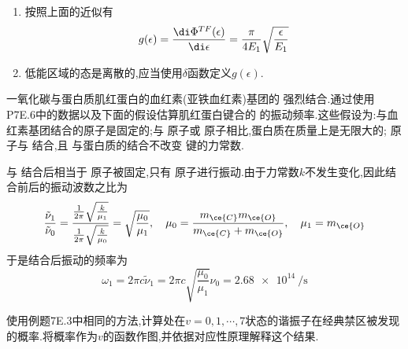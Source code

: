 \documentclass{ctexart}
\begin{document}
\begin{solution}
\begin{enumerate}[label=(\alph*)]
    即
    \[\sqrt{n_x^2+n_y^2+n_z^2}\leq\sqrt{\dfrac{\epsilon}{E_1}}\]
    也即空间中到原点的距离不大于$\sqrt{\dfrac{\epsilon}{E_1}}$的第一卦限内的点的数目.在$\ep\to\infty$时,把整点看作以其为中心的体积为$1$的正方体,所有满足条件的整点近似地组成一个半径为$\sqrt{\dfrac{\epsilon}{E_1}}$的$1/8$球,因此数目近似为
    \[\Psi(\epsilon)\approx\dfrac{1}{8}\dfrac{4}{3}\pi\left(\sqrt{\dfrac{\epsilon}{E_1}}\right)^3=\dfrac{\pi}{6}\left(\dfrac{\epsilon}{E_1}\right)^3\]
    \item 按照上面的近似有
    \[g(\epsilon)=\dfrac{\di\Phi^{TF}(\epsilon)}{\di\epsilon}=\dfrac{\pi}{4E_1}\sqrt{\dfrac{\epsilon}{E_1}}\]
    \item 低能区域的态是离散的,应当使用$\delta$函数定义$g(\epsilon)$.
\end{enumerate}
\end{solution}
\begin{homework}[15.]
    一氧化碳与蛋白质肌红蛋白的血红素(亚铁血红素)基团的 强烈结合.通过使用P7E.6中的数据以及下面的假设估算肌红蛋白键合的 的振动频率.这些假设为:与血红素基团结合的原子是固定的;与 原子或 原子相比,蛋白质在质量上是无限大的; 原子与 结合,且 与蛋白质的结合不改变 键的力常数.
\end{homework}
\begin{solution}
    与 结合后相当于 原子被固定,只有 原子进行振动.由于力常数$k$不发生变化,因此结合前后的振动波数之比为
    \[\dfrac{\tilde{\nu}_1}{\tilde{\nu}_0}=\dfrac{\frac{1}{2\pi}\sqrt{\frac{k}{\mu_1}}}{\frac{1}{2\pi}\sqrt{\frac{k}{\mu_0}}}=\sqrt{\dfrac{\mu_0}{\mu_1}},\quad\mu_0=\dfrac{m_{\ce{C}}m_{\ce{O}}}{m_{\ce{C}}+m_{\ce{O}}},\quad\mu_1=m_{\ce{O}}\]
    于是结合后振动的频率为
    \[\omega_1=2\pi c\tilde{\nu}_1=2\pi c\sqrt{\dfrac{\mu_0}{\mu_1}}\nu_0=\SI{2.68e14}{\per\second}\]
\end{solution}
\begin{homework}[16.]
    使用例题7E.3中相同的方法,计算处在$v=0,1,\cdots,7$状态的谐振子在经典禁区被发现的概率.将概率作为$v$的函数作图,并依据对应性原理解释这个结果.
\end{homework}
\end{document}
